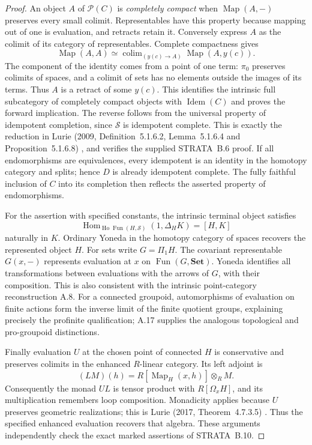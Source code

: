 \begin{proof}
An object $A$ of $\mathcal P(C)$ is \emph{completely compact} when
$\operatorname{Map}(A,-)$ preserves every small colimit. Representables
have this property because mapping out of one is evaluation, and
retracts retain it. Conversely express $A$ as the colimit of its
category of representables. Complete compactness gives
\[
 \operatorname{Map}(A,A)\simeq
    \mathop{\operatorname{colim}}_{(y(c)\to A)}
                       \operatorname{Map}(A,y(c)).
\]
The component of the identity comes from a point of one term:
$\pi_0$ preserves colimits of spaces, and a colimit of sets has no
elements outside the images of its terms. Thus $A$ is a retract of
some $y(c)$. This identifies the intrinsic full subcategory of
completely compact objects with $\operatorname{Idem}(C)$ and proves
the forward implication. The reverse follows from the universal
property of idempotent completion, since $\mathcal S$ is idempotent
complete. This is exactly the reduction in Lurie (2009,
Definition~5.1.6.2, Lemma~5.1.6.4 and Proposition~5.1.6.8)
\cite{FA_LurieHTT2009}, and verifies the supplied STRATA~B.6 proof.
If all endomorphisms are equivalences, every idempotent is an identity
in the homotopy category and splits; hence $D$ is already idempotent
complete. The fully faithful inclusion of $C$ into its completion
then reflects the asserted property of endomorphisms.

For the assertion with specified constants, the intrinsic terminal
object satisfies
\[
 \operatorname{Hom}_{\operatorname{Ho}\operatorname{Fun}(H,\mathcal S)}
                 (1,\Delta_H K)=[H,K]
                                                        \tag{E.15.2}
\]
naturally in $K$. Ordinary Yoneda in the homotopy category of spaces
recovers the represented object $H$. For sets write
$G=\Pi_1H$. The covariant representable $G(x,-)$ represents
evaluation at $x$ on $\operatorname{Fun}(G,\mathbf{Set})$.
Yoneda identifies all transformations between evaluations with the
arrows of $G$, with their composition. This is also consistent with
the intrinsic point-category reconstruction A.8. For a connected
groupoid, automorphisms of evaluation on finite actions form the
inverse limit of the finite quotient groups, explaining precisely
the profinite qualification; A.17 supplies the analogous topological
and pro-groupoid distinctions.

Finally evaluation $U$ at the chosen point of connected $H$ is
conservative and preserves colimits in the enhanced $R$-linear
category. Its left adjoint is
\[
 (LM)(h)=R[\operatorname{Map}_H(x,h)]\otimes_R M.
\]
Consequently the monad $UL$ is tensor product with $R[\Omega_xH]$,
and its multiplication remembers loop composition. Monadicity applies
because $U$ preserves geometric realizations; this is Lurie (2017,
Theorem~4.7.3.5) \cite{FA_LurieHA2017}. Thus the specified enhanced
evaluation recovers that algebra. These arguments independently check
the exact marked assertions of STRATA~B.10.
\end{proof}

